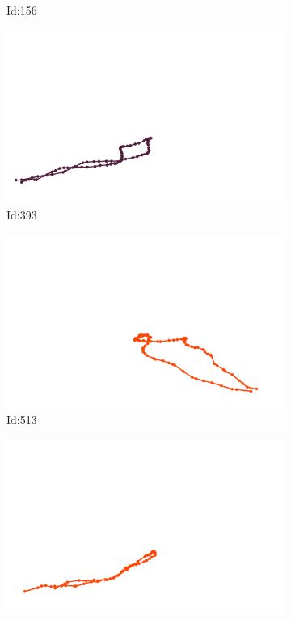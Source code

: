 \documentclass[12pt,twoside]{report}
\begin{document}
\begin{figure}
\begin{subfigure}[b]{0.20\textwidth}
\caption{Id:156}
\end{subfigure}
\begin{subfigure}[b]{0.20\textwidth}
\centering
\includegraphics[width=\textwidth]{../trajectories/393.png}
\caption{Id:393}
\end{subfigure}
\begin{subfigure}[b]{0.20\textwidth}
\centering
\includegraphics[width=\textwidth]{../trajectories/513.png}
\caption{Id:513}
\end{subfigure}
\begin{subfigure}[b]{0.20\textwidth}
\centering
\includegraphics[width=\textwidth]{../trajectories/534.png}

\end{subfigure}
\end{figure}
\end{document}
